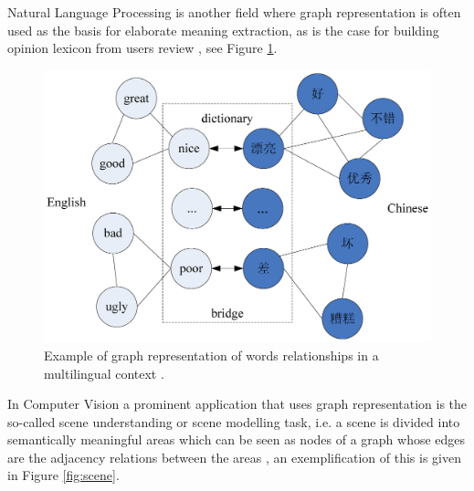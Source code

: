 Natural Language Processing is another field where graph representation is often used
as the basis for elaborate meaning extraction, as is the case for building opinion
lexicon from users review \cite{10.1371/journal.pone.0079294}, see Figure \ref{fig:wordrel}.

\begin{figure}[ht]
    \centering
    \includegraphics[width=.6\linewidth]{Figures/wordrel}
    \caption{Example of graph representation of words relationships in a multilingual
    context \cite{10.1371/journal.pone.0079294}.}
    \label{fig:wordrel}
\end{figure}

In Computer Vision a prominent application that uses graph representation is
the so-called scene understanding or scene modelling task, i.e. a scene is divided
into semantically meaningful areas which can be seen as nodes of a graph whose
edges are the adjacency relations between the areas \cite{journals/corr/abs-1108-4079},
an exemplification of this is given in Figure \ref{fig:scene}.

